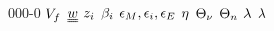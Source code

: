 \begin{mitframe}{000-0}
$\freevol$ \newline
$\vorttens$ \newline
$\charges$ \newline
$\sexcoeff$ \newline
$\eddydiff$ \newline
$\heateffic$ \newline
$\vibrfreqfac$ \newline
$\fftcoeff$ \newline
$\latheat$ \newline
$\debye$ \newline

\end{mitframe}
